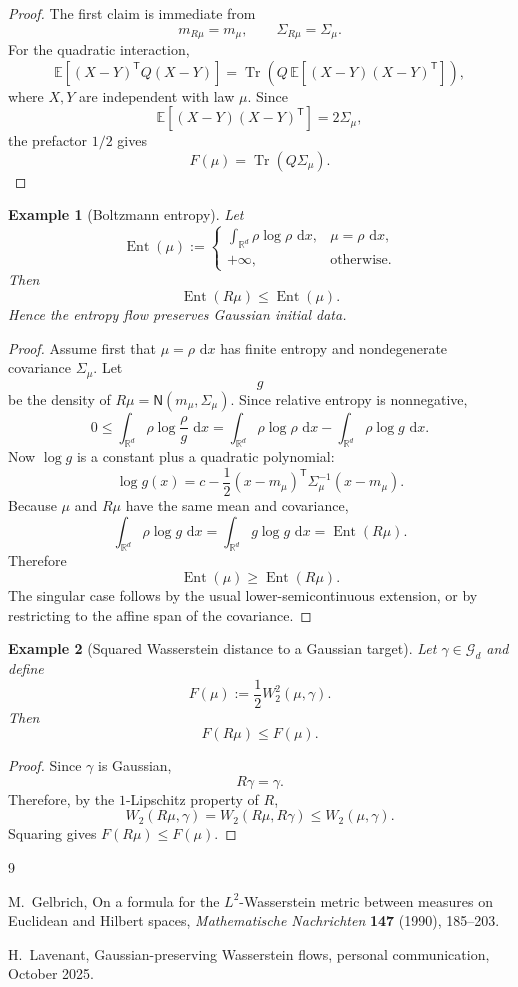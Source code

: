 \documentclass[11pt]{article}
\newtheorem{example}{Example}
\DeclareMathOperator{\Tr}{Tr}
\DeclareMathOperator{\Ent}{Ent}
\newcommand{\R}{\mathbb R}
\newcommand{\W}{W}
\newcommand{\N}{\mathsf N}
\newcommand{\dd}{\,\mathrm d}
\begin{document}
\begin{proof}
The first claim is immediate from
\[
m_{R\mu}=m_\mu,
\qquad
\Sigma_{R\mu}=\Sigma_\mu.
\]
For the quadratic interaction,
\[
\mathbb E[(X-Y)^{\mathsf T}Q(X-Y)]
=
\Tr\!\left(Q\,\mathbb E[(X-Y)(X-Y)^{\mathsf T}]\right),
\]
where $X,Y$ are independent with law $\mu$. Since
\[
\mathbb E[(X-Y)(X-Y)^{\mathsf T}]=2\Sigma_\mu,
\]
the prefactor $1/2$ gives
\[
F(\mu)=\Tr(Q\Sigma_\mu).
\]
\end{proof}

\begin{example}[Boltzmann entropy]
Let
\[
\Ent(\mu)
:=
\begin{cases}
\displaystyle \int_{\R^d}\rho\log\rho\,\dd x,
& \mu=\rho\,\dd x,\\[0.8em]
+\infty,
& \text{otherwise}.
\end{cases}
\]
Then
\[
\Ent(R\mu)\le \Ent(\mu).
\]
Hence the entropy flow preserves Gaussian initial data.
\end{example}

\begin{proof}
Assume first that $\mu=\rho\,\dd x$ has finite entropy and nondegenerate covariance $\Sigma_\mu$. Let
\[
g
\]
be the density of $R\mu=\N(m_\mu,\Sigma_\mu)$. Since relative entropy is nonnegative,
\[
0\le \int_{\R^d}\rho\log\frac{\rho}{g}\,\dd x
=
\int_{\R^d}\rho\log\rho\,\dd x
-
\int_{\R^d}\rho\log g\,\dd x.
\]
Now $\log g$ is a constant plus a quadratic polynomial:
\[
\log g(x)
=
c-\frac12(x-m_\mu)^{\mathsf T}\Sigma_\mu^{-1}(x-m_\mu).
\]
Because $\mu$ and $R\mu$ have the same mean and covariance,
\[
\int_{\R^d}\rho\log g\,\dd x
=
\int_{\R^d}g\log g\,\dd x
=
\Ent(R\mu).
\]
Therefore
\[
\Ent(\mu)\ge \Ent(R\mu).
\]
The singular case follows by the usual lower-semicontinuous extension, or by restricting to the affine span of the covariance.
\end{proof}

\begin{example}[Squared Wasserstein distance to a Gaussian target]
Let $\gamma\in\mathcal G_d$ and define
\[
F(\mu):=\frac12\W_2^2(\mu,\gamma).
\]
Then
\[
F(R\mu)\le F(\mu).
\]
\end{example}

\begin{proof}
Since $\gamma$ is Gaussian,
\[
R\gamma=\gamma.
\]
Therefore, by the $1$-Lipschitz property of $R$,
\[
\W_2(R\mu,\gamma)
=
\W_2(R\mu,R\gamma)
\le
\W_2(\mu,\gamma).
\]
Squaring gives $F(R\mu)\le F(\mu)$.
\end{proof}



\begin{thebibliography}{9}

M.~Gelbrich,
\newblock On a formula for the $L^2$-Wasserstein metric between measures on Euclidean and Hilbert spaces,
\newblock \emph{Mathematische Nachrichten} \textbf{147} (1990), 185--203.

H.~Lavenant,
\newblock Gaussian-preserving Wasserstein flows,
\newblock personal communication, October 2025.

\end{thebibliography}
\end{document}
